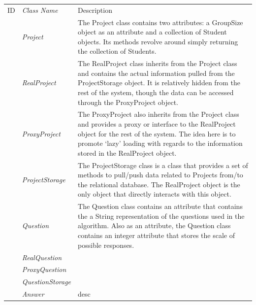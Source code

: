 \documentclass[12pt,letterpaper]{article}
\begin{document}
\begin{center}
\begin{tabu} to 
	\tableheader{}ID & Class Name & Description \\
	 & Project & The Project class contains two attributes: a GroupSize object as an attribute and a collection of Student objects. Its methods revolve around simply returning the collection of Students.\\
	 & RealProject & The RealProject class inherits from the Project class and contains the actual information pulled from the ProjectStorage object. It is relatively hidden from the rest of the system, though the data can be accessed through the ProxyProject object.\\
	 & ProxyProject & The ProxyProject also inherits from the Project class and provides a proxy or interface to the RealProject object for the rest of the system. The idea here is to promote `lazy' loading with regards to the information stored in the RealProject object.\\
	 & ProjectStorage & The ProjectStorage class is a class that provides a set of methods to pull/push data related to Projects from/to the relational database. The RealProject object is the only object that directly interacts with this object.\\
	 & Question & The Question class contains an attribute that contains the a String representation of the questions used in the algorithm. Also as an attribute, the Question class contains an integer attribute that stores the scale of possible responses. \\
	 & RealQuestion & \\
	 & ProxyQuestion & \\
	 & QuestionStorage & \\
	 & Answer & desc \\
\end{tabu}
\end{center}
\end{document}

